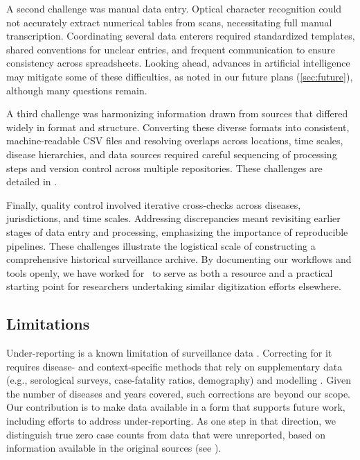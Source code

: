 \documentclass[12pt]{article}
\begin{document}
A second challenge was manual data entry. Optical character recognition could not accurately extract numerical tables from scans, necessitating full manual transcription. Coordinating several data enterers required standardized templates, shared conventions for unclear entries, and frequent communication to ensure consistency across spreadsheets. Looking ahead, advances in artificial intelligence may mitigate some of these difficulties, as noted in our future plans (\cref{sec:future}), although many questions remain.

A third challenge was harmonizing information drawn from sources that differed widely in format and structure. Converting these diverse formats into consistent, machine-readable CSV files and resolving overlaps across locations, time scales, disease hierarchies, and data sources required careful sequencing of processing steps and version control across multiple repositories. These challenges are detailed in .

Finally, quality control involved iterative cross-checks across diseases, jurisdictions, and time scales. Addressing discrepancies meant revisiting earlier stages of data entry and processing, emphasizing the importance of reproducible pipelines. These challenges illustrate the logistical scale of constructing a comprehensive historical surveillance archive. By documenting our workflows and tools openly, we have worked for \datacronym\ to serve as both a resource and a practical starting point for researchers undertaking similar digitization efforts elsewhere.

\subsection{Limitations}\label{sec:limitations}

Under-reporting is a known limitation of surveillance data \cite{van2013contagious,gibbons2014measuring}. Correcting for it requires disease- and context-specific methods that rely on supplementary data (e.g., serological surveys, case-fatality ratios, demography) and modelling \cite{mangen2011current}. Given the number of diseases and years covered, such corrections are beyond our scope. Our contribution is to make data available in a form that supports future work, including efforts to address under-reporting. As one step in that direction, we distinguish true zero case counts from data that were unreported, based on information available in the original sources (see ).
\end{document}
